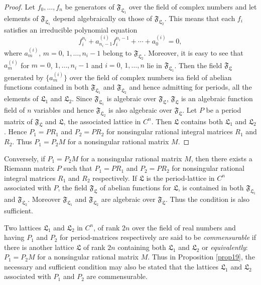 \begin{proof}
Let $f_{0},\ldots,f_{n}$ be generators of
$\mathfrak{F}_{\mathfrak{L}_{1}}$ over the field of complex numbers
and let elements of $\mathfrak{F}_{\mathfrak{L}_{1}}$ depend
algebraically on those of $\mathfrak{F}_{\mathfrak{L}_{2}}$. This
means that each $f_{i}$ satisfies an irreducible polynomial equation
$$
f^{n_{i}}_{i}+a^{(i)}_{n_{i}-1}f^{n_{i}-1}_{i}+\cdots+a^{(i)}_{0}=0,
$$
where $a^{(i)}_{m}$, $m=0$, $1,\ldots,n_{i}-1$ belong to
$\mathfrak{F}_{\mathfrak{L}_{2}}$. Moreover, it is easy to see that
$a^{(i)}_{m}$ for $m=0$, $1,\ldots,n_{i}-1$ and $i=0$, $1,\ldots,n$
lie in $\mathfrak{F}_{\mathfrak{L}_{1}}$. Then the field
$\mathfrak{F}_{\mathfrak{L}}$ generated by $\{a^{(i)}_{m}\}$ over the
field of complex numbers is\pageoriginale a field of abelian functions
contained in both $\mathfrak{F}_{\mathfrak{L}_{1}}$ and
$\mathfrak{F}_{\mathfrak{L}_{2}}$ and hence admitting for periods, all
the elements of $\mathfrak{L}_{1}$ and $\mathfrak{L}_{2}$. Since
$\mathfrak{F}_{\mathfrak{L}_{1}}$ is algebraic over
$\mathfrak{F}_{\mathfrak{L}}$, $\mathfrak{F}_{\mathfrak{L}}$ is an
algebraic function field of $n$ variables and hence
$\mathfrak{F}_{\mathfrak{L}_{2}}$ is also algebraic over
$\mathfrak{F}_{\mathfrak{L}}$. Let $P$ be a period matrix of
$\mathfrak{F}_{\mathfrak{L}}$ and $\mathfrak{L}$, the associated
lattice in $C^{n}$. Then $\mathfrak{L}$ contains both
$\mathfrak{L}_{1}$ and $\mathfrak{L}_{2}$. Hence $P_{1}=PR_{1}$ and
$P_{2}=PR_{2}$ for nonsingular rational integral matrices $R_{1}$ and
$R_{2}$. Thus $P_{1}=P_{2}M$ for a nonsingular rational matrix $M$.
\end{proof}

Conversely, if $P_{1}=P_{2}M$ for a nonsingular rational matrix $M$,
then there exists a Riemann matrix $P$ such that $P_{1}=PR_{1}$ and
$P_{2}=PR_{2}$ for nonsingular rational integral matrices $R_{1}$ and
$R_{2}$ respectively. If $\mathfrak{L}$ is the period-lattice in
$C^{n}$ associated with $P$, the field $\mathfrak{F}_{\mathfrak{L}}$
of abelian functions for $\mathfrak{L}$, is contained in both
$\mathfrak{F}_{\mathfrak{L}_{1}}$ and
$\mathfrak{F}_{\mathfrak{L}_{2}}$. Moreover
$\mathfrak{F}_{\mathfrak{L}_{1}}$ and
$\mathfrak{F}_{\mathfrak{L}_{2}}$ are algebraic over
$\mathfrak{F}_{\mathfrak{L}}$. Thus the condition is also sufficient.

Two lattices $\mathfrak{L}_{1}$ and $\mathfrak{L}_{2}$ in $C^{n}$, of
rank $2n$ over the field of real numbers and having $P_{1}$ and
$P_{2}$ for period-matrices respectively are said to be {\em
  commensurable} if there is another lattice $\mathfrak{L}$ of rank
$2n$ containing both $\mathfrak{L}_{1}$ and $\mathfrak{L}_{2}$ or {\em
  equivalently}: $P_{1}=P_{2}M$ for a nonsingular rational matrix
$M$. Thus in Proposition \ref{prop19}, the necessary and sufficient
condition may also be stated that the lattices $\mathfrak{L}_{1}$ and
$\mathfrak{L}_{2}$ associated with $P_{1}$ and $P_{2}$ are
commensurable.

